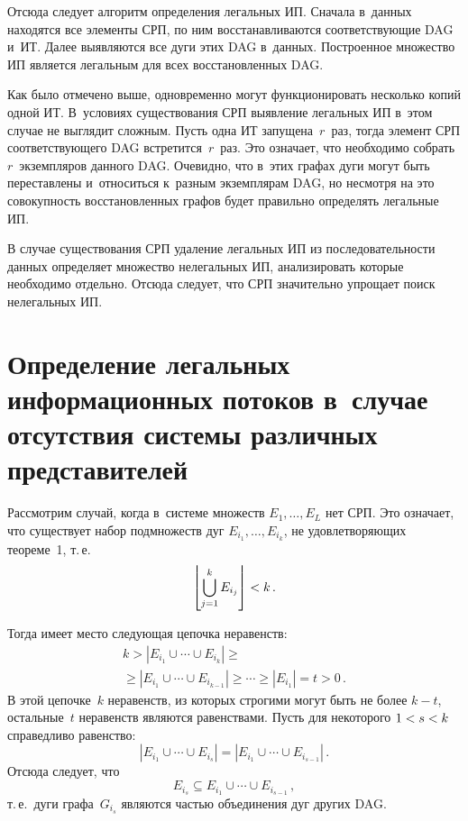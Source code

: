 \begin{multicols}{2}
  Отсюда следует алгоритм определения легальных ИП. Сначала в~данных 
находятся все элементы СРП, по ним восстанавливаются соответствующие DAG 
и~ИТ. Далее выявляются все дуги этих DAG в~данных. Построенное множество 
ИП является легальным для всех восстановленных DAG. 
  
  Как было отмечено выше, одновременно могут функционировать несколько 
копий одной ИТ. В~условиях существования СРП выявление легальных ИП 
в~этом случае не выглядит сложным. Пусть одна ИТ запущена~$r$~раз, тогда 
элемент СРП соответствующего DAG встретится~$r$~раз. Это означает, что 
необходимо собрать~$r$~экземпляров данного DAG. Очевидно, что в~этих графах 
дуги могут быть переставлены и~относиться к~разным экземплярам DAG, но 
несмотря на это совокупность вос\-ста\-нов\-лен\-ных графов будет правильно 
определять легальные ИП. 
  
  В случае существования СРП удаление легальных ИП из последовательности 
данных определяет множество нелегальных ИП, анализировать которые 
необходимо отдельно. Отсюда следует, что СРП значительно упрощает поиск 
нелегальных ИП. 
  
  \section{Определение легальных информационных потоков 
  в~случае отсутствия системы различных представителей}
  
  Рассмотрим случай, когда в~системе множеств $E_1, \ldots , E_L$ нет СРП. Это 
означает, что существует набор подмножеств дуг $E_{i_1}, \ldots , E_{i_k}$, не 
удовлетворяющих теореме~1, т.\,е.
$$
\left\lfloor \bigcup\limits^k_{j=1} E_{i_j} \right\rfloor 
\hm <k\,.
$$

 Тогда имеет место следующая цепочка неравенств:
  \begin{multline*}
  k> \left\vert E_{i_1} \cup \cdots \cup E_{i_k}\right\vert \geq{}\\
  {}\geq \left\vert
  E_{i_1}\cup\cdots\cup E_{i_{k-1}}\right\vert \geq \cdots \geq \left\vert 
E_{i_1}\right\vert  =t>0\,.
  \end{multline*}
В этой цепочке~$k$ неравенств, из которых строгими могут быть не более $k-t$, 
остальные~$t$ неравенств являются равенствами. Пусть для некоторого $1\hm< 
s\hm< k$ справедливо равенство:
$$
\left\vert E_{i_1} \cup\cdots \cup E_{i_s}\right\vert =\left\vert E_{i_1} \cup\cdots\cup 
E_{i_{s-1}}\right\vert\,.
$$
Отсюда следует, что 
$$
E_{i_s}\subseteq E_{i_1}\cup\cdots\cup E_{i_{s-1}}\,,
$$
т.\,е.\ дуги графа~$G_{i_s}$ являются частью объединения дуг других DAG.


\end{multicols}
